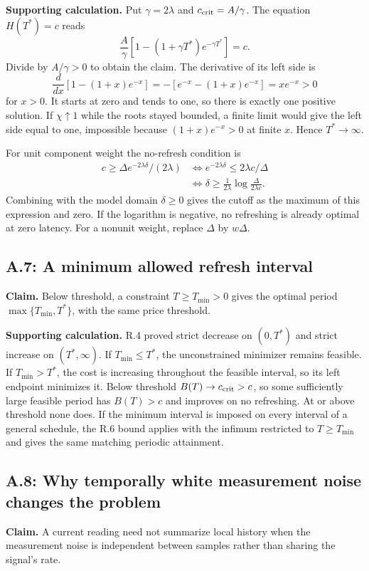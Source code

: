 \documentclass[12pt,letterpaper]{article}
\begin{document}
\textbf{Supporting calculation.} Put $\gamma=2\lambda$ and $c_{\rm crit}=A/\gamma$. The equation $H(T^*)=c$ reads
\[
\frac A\gamma[1-(1+\gamma T^*)e^{-\gamma T^*}]=c.
\]
Divide by $A/\gamma>0$ to obtain the claim. The derivative of its left side is
\[
\frac{d}{dx}[1-(1+x)e^{-x}]=-[e^{-x}-(1+x)e^{-x}]=xe^{-x}>0
\]
for $x>0$. It starts at zero and tends to one, so there is exactly one positive solution. If $\chi\uparrow1$ while the roots stayed bounded, a finite limit would give the left side equal to one, impossible because $(1+x)e^{-x}>0$ at finite $x$. Hence $T^*\to\infty$.

For unit component weight the no-refresh condition is
\begin{align*}
c\ge\Delta e^{-2\lambda\delta}/(2\lambda)
&\iff e^{-2\lambda\delta}\le 2\lambda c/\Delta\\
&\iff \delta\ge\frac1{2\lambda}\log\frac{\Delta}{2\lambda c}.
\end{align*}
Combining with the model domain $\delta\ge0$ gives the cutoff as the maximum of this expression and zero. If the logarithm is negative, no refreshing is already optimal at zero latency. For a nonunit weight, replace $\Delta$ by $w\Delta$.

\subsection{A.7: A minimum allowed refresh interval}
\textbf{Claim.} Below threshold, a constraint $T\ge T_{\min}>0$ gives the optimal period $\max\{T_{\min},T^*\}$, with the same price threshold.

\textbf{Supporting calculation.} R.4 proved strict decrease on $(0,T^*)$ and strict increase on $(T^*,\infty)$. If $T_{\min}\le T^*$, the unconstrained minimizer remains feasible. If $T_{\min}>T^*$, the cost is increasing throughout the feasible interval, so its left endpoint minimizes it. Below threshold $B(T)\to c_{\rm crit}>c$, so some sufficiently large feasible period has $B(T)>c$ and improves on no refreshing. At or above threshold none does. If the minimum interval is imposed on every interval of a general schedule, the R.6 bound applies with the infimum restricted to $T\ge T_{\min}$ and gives the same matching periodic attainment.

\subsection{A.8: Why temporally white measurement noise changes the problem}
\textbf{Claim.} A current reading need not summarize local history when the measurement noise is independent between samples rather than sharing the signal's rate.
\end{document}
